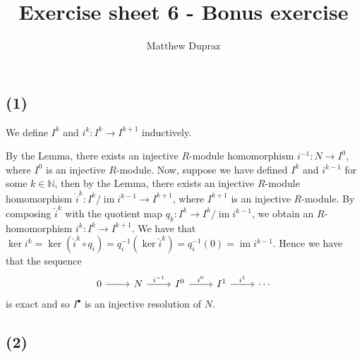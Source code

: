 \documentclass{article}
\title{Exercise sheet 6 - Bonus exercise}
\author{Matthew Dupraz}
\DeclareMathOperator{\im}{im}
\newcommand{\N}{\mathbb{N}}
\begin{document}
	
\maketitle

\subsection*{(1)}

We define $I^k$ and $i^k: I^k \to I^{k+1}$ inductively.

By the Lemma, there exists an injective $R$-module homomorphism
$i^{-1}: N \to I^0$, where $I^0$ is an injective $R$-module.
Now, suppose we have defined $I^k$ and $i^{k-1}$
for some $k \in \N$, then by the Lemma, there exists an injective
$R$-module homomorphism $\hat{i}^k: I^k/\im i^{k-1} \to I^{k+1}$,
where $I^{k+1}$ is an injective $R$-module.
By composing $\hat{i}^k$ with the quotient map
$q_k: I^k \to I^k/\im i^{k-1}$, we obtain an
$R$-homomorphism $i^k: I^k \to I^{k+1}$.
We have that $\ker{i^k} = \ker(\hat{i}^k \circ q_i)
= q_i^{-1}(\ker \hat{i}^k) = q_i^{-1}(0) = \im i^{k-1}$.
Hence we have that the sequence
\begin{equation*}
\begin{tikzcd}
0 \arrow[r] & N \arrow[r, "i^{-1}"] & I^0 \arrow[r, "i^0"] & I^1 \arrow[r, "i^1"] & \cdots
\end{tikzcd}
\end{equation*}
is exact and so $I^\bullet$ is an injective resolution of $N$.

\subsection*{(2)}
\end{document}

